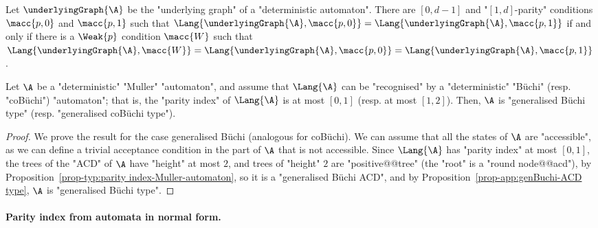 \documentclass[10pt,a4paper]{amsart}
\begin{document}
\begin{corollary}
	Let $\underlyingGraph{\A}$ be the "underlying graph" of a "deterministic automaton". There are $[0,d-1]$ and "$[1,d]$-parity" conditions $\macc{p,0}$ and $\macc{p,1}$ such that $\Lang{\underlyingGraph{\A},\macc{p,0}} = \Lang{\underlyingGraph{\A},\macc{p,1}}$ if and only if there is a $\Weak{p}$ condition $\macc{W}$ such that $\Lang{\underlyingGraph{\A},\macc{W}} =\Lang{\underlyingGraph{\A},\macc{p,0}} = \Lang{\underlyingGraph{\A},\macc{p,1}}$.
\end{corollary}


\begin{proposition}
	Let $\A$ be a "deterministic" "Muller" "automaton", and assume that $\Lang{\A}$ can be "recognised" by a "deterministic" "B\"uchi" (resp. "coB\"uchi") "automaton"; that is, the "parity index" of $\Lang{\A}$ is at most $[0,1]$ (resp. at most $[1,2]$). Then, $\A$ is "generalised B\"uchi type" (resp. "generalised coB\"uchi type").
\end{proposition}
\begin{proof}
	We prove the result for the case generalised B\"uchi (analogous for coB\"uchi). We can assume that all the states of $\A$ are "accessible", as we can define a trivial acceptance condition in the part of $\A$ that is not accessible.  Since $\Lang{\A}$ has "parity index" at most $[0,1]$, the trees of the "ACD" of $\A$ have "height" at most $2$, and trees of "height" $2$ are "positive@@tree" (the "root" is a "round node@@acd"), by Proposition~\ref{prop-typ:parity index-Muller-automaton}, so it is a "generalised B\"uchi ACD", and by Proposition~\ref{prop-app:genBuchi-ACD type}, $\A$ is "generalised B\"uchi type".
\end{proof}


\paragraph*{Parity index from automata in normal form.}
\end{document}

